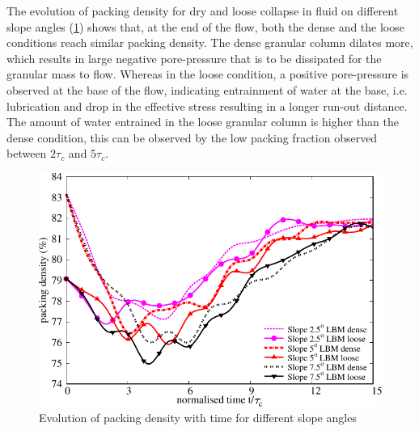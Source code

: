 The evolution of packing density for dry and loose collapse in fluid on 
different slope angles (\cref{fig:voro}) shows that, at the end 
of the flow, both the dense and the loose conditions reach similar packing 
density. The dense granular column dilates more, which results in large 
negative pore-pressure that is to be dissipated for the granular mass to flow. 
Whereas in the loose condition, a positive 
pore-pressure is observed at the base of the flow, indicating entrainment of 
water at the base, i.e. lubrication and drop in the effective stress resulting 
in a longer run-out distance. The amount of water entrained in the loose 
granular 
column is higher than the dense condition, this can be observed by the low 
packing fraction observed between $2\tau_c$ and $5 \tau_c$. 

\begin{figure}
\centering
\includegraphics[width=0.97\columnwidth]{Voronoi_Slope_Dense_Loose}
\caption{Evolution of packing density with time for different slope angles}
\label{fig:voro}
\end{figure}

